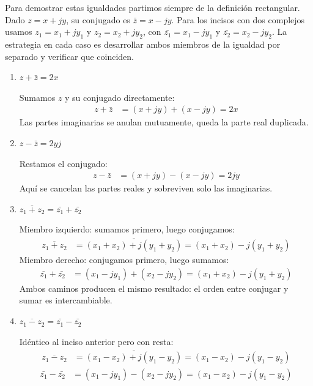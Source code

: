 \documentclass[10pt,a4paper]{article}
\begin{document}
Para demostrar estas igualdades partimos siempre de la definición rectangular. Dado $z = x+jy$, su conjugado es $\bar{z} = x-jy$. Para los incisos con dos complejos usamos $z_1 = x_1+jy_1$ y $z_2 = x_2+jy_2$, con $\bar{z_1} = x_1-jy_1$ y $\bar{z_2} = x_2-jy_2$. La estrategia en cada caso es desarrollar ambos miembros de la igualdad por separado y verificar que coinciden.

\begin{enumerate}[label=\textbf{\alph*)}]
	\item \textbf{$z + \bar{z} = 2x$}

	Sumamos $z$ y su conjugado directamente:
	\begin{align*}
		z + \bar{z} &= (x+jy) + (x-jy) = 2x
	\end{align*}
	Las partes imaginarias se anulan mutuamente, queda la parte real duplicada.

	\item \textbf{$z - \bar{z} = 2yj$}

	Restamos el conjugado:
	\begin{align*}
		z - \bar{z} &= (x+jy) - (x-jy) = 2jy
	\end{align*}
	Aquí se cancelan las partes reales y sobreviven solo las imaginarias.

	\item \textbf{$\overline{z_1 + z_2} = \bar{z_1}+\bar{z_2}$}

	Miembro izquierdo: sumamos primero, luego conjugamos:
	\begin{align*}
		\overline{z_1 + z_2} &= \overline{(x_1+x_2) + j(y_1+y_2)} = (x_1+x_2) - j(y_1+y_2)
	\end{align*}
	Miembro derecho: conjugamos primero, luego sumamos:
	\begin{align*}
		\bar{z_1}+\bar{z_2} &= (x_1-jy_1)+(x_2-jy_2) = (x_1+x_2) - j(y_1+y_2)
	\end{align*}
	Ambos caminos producen el mismo resultado: el orden entre conjugar y sumar es intercambiable.

	\item \textbf{$\overline{z_1 - z_2} = \bar{z_1}-\bar{z_2}$}

	Idéntico al inciso anterior pero con resta:
	\begin{align*}
		\overline{z_1 - z_2} &= \overline{(x_1-x_2) + j(y_1-y_2)} = (x_1-x_2) - j(y_1-y_2)
	\end{align*}
	\begin{align*}
		\bar{z_1}-\bar{z_2} &= (x_1-jy_1)-(x_2-jy_2) = (x_1-x_2) - j(y_1-y_2)
	\end{align*}


\end{enumerate}
\end{document}
